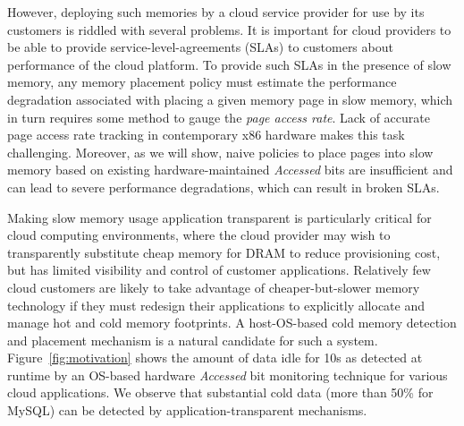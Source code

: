 However, deploying such memories by a cloud service provider for use by its
customers is riddled with several problems. It is important for cloud providers
to be able to provide service-level-agreements (SLAs) to customers about
performance of the cloud platform. To provide such SLAs in the presence of slow
memory, any memory placement policy must estimate the performance degradation
associated with placing a given memory page in slow memory, which in turn requires some
method to gauge the {\it page access rate}. Lack of accurate page access
rate tracking in contemporary x86 hardware makes this task challenging.
Moreover, as we will show, naive policies to place pages into slow memory based
on existing hardware-maintained {\it Accessed} bits are insufficient and can lead to severe
performance degradations, which can result in broken SLAs.

Making slow memory usage application transparent is particularly
critical for cloud computing environments, where the cloud provider may wish to
transparently substitute cheap memory for DRAM to reduce provisioning cost, but
has limited visibility and control of customer applications.  Relatively few
cloud customers are likely to take advantage of cheaper-but-slower memory
technology if they must redesign their applications to explicitly allocate and
manage hot and cold memory footprints. A host-OS-based cold memory detection and
placement mechanism is a natural candidate for such a system.
Figure~\ref{fig:motivation} shows the amount of data idle for 10s as detected at
runtime by an OS-based hardware {\it Accessed} bit monitoring technique for various
cloud applications. We observe that substantial cold data (more
than 50\% for MySQL) can be detected by application-transparent mechanisms.

